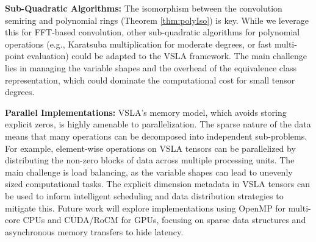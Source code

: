 \textbf{Sub-Quadratic Algorithms:} The isomorphism between the convolution semiring and polynomial rings (Theorem \ref{thm:polyIso}) is key. While we leverage this for FFT-based convolution, other sub-quadratic algorithms for polynomial operations (e.g., Karatsuba multiplication for moderate degrees, or fast multi-point evaluation) could be adapted to the VSLA framework. The main challenge lies in managing the variable shapes and the overhead of the equivalence class representation, which could dominate the computational cost for small tensor degrees.

\textbf{Parallel Implementations:} VSLA's memory model, which avoids storing explicit zeros, is highly amenable to parallelization. The sparse nature of the data means that many operations can be decomposed into independent sub-problems. For example, element-wise operations on VSLA tensors can be parallelized by distributing the non-zero blocks of data across multiple processing units. The main challenge is load balancing, as the variable shapes can lead to unevenly sized computational tasks. The explicit dimension metadata in VSLA tensors can be used to inform intelligent scheduling and data distribution strategies to mitigate this. Future work will explore implementations using OpenMP for multi-core CPUs and CUDA/RoCM for GPUs, focusing on sparse data structures and asynchronous memory transfers to hide latency.
